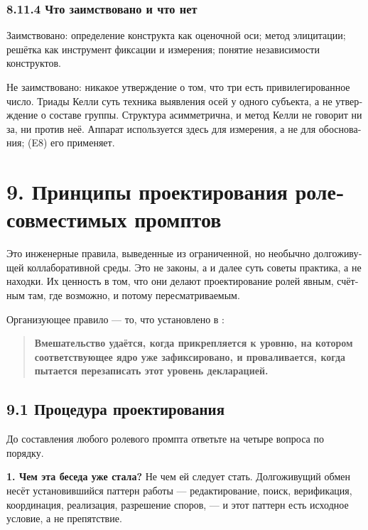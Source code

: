 \begin{russian}
\subsubsection*{8.11.4 Что заимствовано и что нет}
\label{sec:ru:8.11.4}

Заимствовано: определение конструкта как оценочной оси; метод элицитации; решётка как инструмент фиксации и измерения; понятие независимости конструктов.

Не заимствовано: никакое утверждение о том, что три есть привилегированное число. Триады Келли суть техника выявления осей у одного субъекта, а не утверждение о составе группы. Структура  асимметрична, и метод Келли не говорит ни за, ни против неё. Аппарат используется здесь для измерения, а не для обоснования;  (E8) его применяет.


\section*{9. Принципы проектирования ролесовместимых промптов}
\label{sec:ru:9}

Это инженерные правила, выведенные из ограниченной, но необычно долгоживущей коллаборативной среды. Это не законы, а  и далее суть советы практика, а не находки. Их ценность в том, что они делают проектирование ролей явным, счётным там, где возможно, и потому пересматриваемым.

Организующее правило — то, что установлено в :

\begin{quote}
\textbf{Вмешательство удаётся, когда прикрепляется к уровню, на котором соответствующее ядро уже зафиксировано, и проваливается, когда пытается перезаписать этот уровень декларацией.}
\end{quote}

\subsection*{9.1 Процедура проектирования}
\label{sec:ru:9.1}

До составления любого ролевого промпта ответьте на четыре вопроса по порядку.

\textbf{1. Чем эта беседа уже стала?} Не чем ей следует стать. Долгоживущий обмен несёт установившийся паттерн работы — редактирование, поиск, верификация, координация, реализация, разрешение споров, — и этот паттерн есть исходное условие, а не препятствие.


\end{russian}
